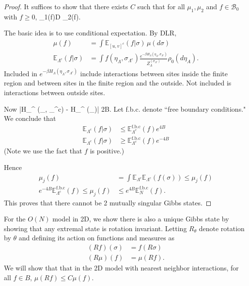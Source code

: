 \begin{proof}
It suffices to show that there exists $C$ such that for all $\mu_1,\mu_2$ and $f\in \mathcal{B}_0$ with $f\ge 0$, 
\be
\mu_1(f)\le D \mu_2(f).
\ee


The basic idea is to use conditional expectation.  By DLR,
\begin{align}
\mu(f) &= \int \mathbb{E}_{[u,v]^c} (f|\sigma) \,\mu(d\sigma)\\
\mathbb{E}_{\Lambda^c} (f|\sigma) &= \int f(\eta_\Lambda, \sigma_{\Lambda^c}) \frac{e^{-\beta H_{\Lambda}(\eta_\Lambda, \sigma_{\Lambda^c})}}{Z_{\Lambda}^{(\sigma_{\Lambda^c})}}\rho_0(d\eta_A).
\end{align}
Included in $e^{-\beta H_{\Lambda}(\eta_\Lambda, \sigma_{\Lambda^c})}$ include interactions between sites inside the finite region and between sites in the finite region and the outside. Not included is interactions between outside sites.

Now 
\be
|H_{\Lambda}^{} (\eta_\Lambda, \sigma_{\Lambda^c}) - H_{\Lambda}^{\circ} (\eta_\Lambda)| \le 2B.
\ee
Let f.b.c. denote ``free boundary conditions." 
We conclude that 
\begin{align}
\mathbb{E}_{\Lambda^c}(f|\sigma)  &\le \mathbb{E}_{\Lambda^c}^{\text{f.b.c}} (f) e^{4B}\\
\mathbb{E}_{\Lambda^c}(f|\sigma)  &\ge \mathbb{E}_{\Lambda^c}^{\text{f.b.c}} (f) e^{-4B}
\end{align}
(Note we use the fact that $f$ is positive.)

Hence
\begin{align}
\mu_j(f) &= \int \mathbb{E}_{\Lambda^c} \mathbb{E}_{\Lambda^c}(f(\sigma)) \le \mu_j(f) \\
e^{-4B} \mathbb{E}_{\Lambda^c}^{\text{f.b.c}} (f) \le \mu_j(f) &\le e^{4B} \mathbb{E}_N^{\text{f.b.c}} (f).
\end{align}
This proves that there cannot be 2 mutually singular Gibbs states.
\end{proof}


For the $O(N)$ model in 2D, we show there is also a unique Gibbs state by showing that any extremal state is rotation invariant. Letting $R_\theta$ denote rotation by $\theta$ and defining its action on functions and measures as
\begin{align}
(Rf)(\sigma) &= f(R\sigma)\\
(R\mu)(f)&= \mu(Rf).
\end{align}
We will show that that in the 2D model with nearest neighbor interactions, for all $f\in B$, $\mu(Rf)\le C\mu(f)$.  

